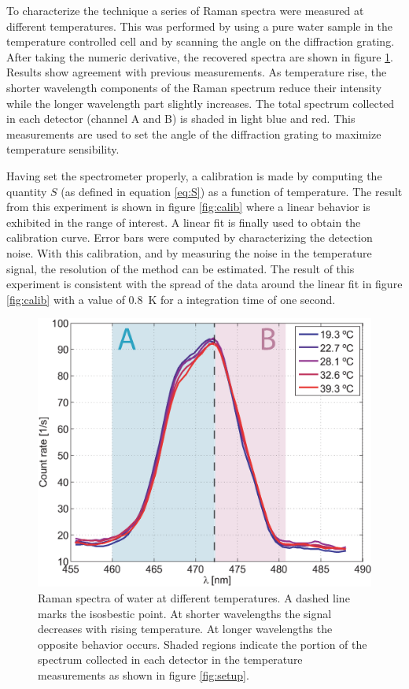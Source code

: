 \documentclass[9pt,twocolumn,twoside]{osajnl}
\begin{document}
To characterize the technique a series of Raman spectra were measured at different temperatures. This was performed by using a pure water sample in the temperature controlled cell and by scanning the angle on the diffraction grating. After taking the numeric derivative, the recovered spectra are shown in figure \ref{fig:spectra}. Results show agreement with previous measurements\cite{walrafen1}. As temperature rise, the shorter wavelength components of the Raman spectrum reduce their intensity while the longer wavelength part slightly increases. The total spectrum collected in each detector (channel A and B) is shaded in light blue and red. This measurements are used to set the angle of the diffraction grating to maximize temperature sensibility. 

Having set the spectrometer properly, a calibration is made by computing the quantity $S$ (as defined in equation \ref{eq:S}) as a function of temperature. The result from this experiment is shown in figure \ref{fig:calib} where a linear behavior is exhibited in the range of interest. A linear fit is finally used to obtain the calibration curve. Error bars were computed by characterizing the detection noise. With this calibration, and by measuring the noise in the temperature signal, the resolution of the method can be estimated. The result of this experiment is consistent with the spread of the data around the linear fit in figure \ref{fig:calib} with a value of 0.8~K for a integration time of one second.

\begin{figure}[htbp]
\centering
\includegraphics[width=\columnwidth]{figs/fig2.eps}
\caption{Raman spectra of water at different temperatures. A dashed line marks the isosbestic point. At shorter wavelengths the signal decreases with rising temperature. At longer wavelengths the opposite behavior occurs. Shaded regions indicate the portion of the spectrum collected in each detector in the temperature measurements as shown in figure \ref{fig:setup}.\label{fig:spectra}}
\end{figure}
\end{document}

